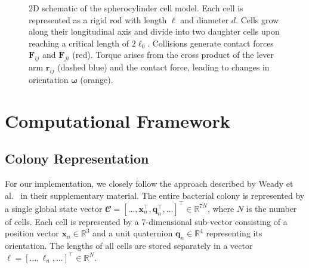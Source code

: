 \documentclass[conference]{IEEEtran}
\begin{document}
\begin{figure}[H]
    \caption{2D schematic of the spherocylinder cell model. Each cell is represented as a rigid rod with length $\ell$ and diameter $d$. Cells grow along their longitudinal axis and divide into two daughter cells upon reaching a critical length of $2\ell_0$. Collisions generate contact forces $\mathbf{F}_{ij}$ and $\mathbf{F}_{ji}$ (red). Torque arises from the cross product of the lever arm $\mathbf{r}_{ij}$ (dashed blue) and the contact force, leading to changes in orientation $\boldsymbol{\omega}$ (orange).}
    \label{fig:spherocylinder_model}

\end{figure}

\newpage

\section{Computational Framework}

\subsection{Colony Representation}

For our implementation, we closely follow the approach described by Weady et al.~\cite{Weady2024} in their supplementary material. The entire bacterial colony is represented by a single global state vector $\mathbfcal{C} = [\dots, \mathbf{x}_n^\top, \mathbf{q}_n^\top, \dots]^\top \in \mathbb{R}^{7N}$, where $N$ is the number of cells. Each cell is represented by a 7-dimensional sub-vector consisting of a position vector $\mathbf{x}_n \in \mathbb{R}^3$ and a unit quaternion $\mathbf{q}_n \in \mathbb{R}^4$ representing its orientation. The lengths of all cells are stored separately in a vector $\boldsymbol{\ell} = [\dots, \ell_n, \dots]^\top \in \mathbb{R}^{N}$.
\end{document}
